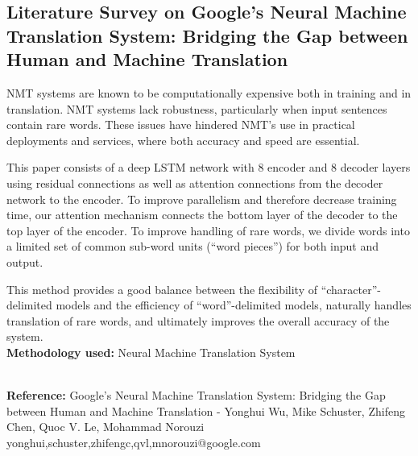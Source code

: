 \subsection{Literature Survey on Google’s Neural Machine Translation System: Bridging the Gap between Human and Machine Translation}
{\normalsize {\par NMT systems are known to be computationally expensive both in training and in translation. NMT systems lack robustness, particularly when input sentences contain rare words. These issues have hindered NMT’s use in practical deployments and services, where both accuracy and speed are essential.
\par This paper consists of a deep LSTM network with 8 encoder and 8 decoder layers using residual connections as well as attention connections from the decoder network to the encoder. To improve parallelism and therefore decrease training time, our attention mechanism connects the bottom layer of the decoder to the top layer of the encoder. To improve handling of rare words, we divide words into a limited set of common sub-word units (“word pieces”) for both input and output.
\par This method provides a good balance between the flexibility of “character”-delimited models and the efficiency of “word”-delimited models, naturally handles translation of rare words, and ultimately improves the overall accuracy of the system. 
\\
\newline
{\textbf{Methodology used:}} Neural Machine Translation System}}
\newline
\\
{\textbf{Reference:} Google’s Neural Machine Translation System: Bridging the Gap between Human and Machine Translation - Yonghui Wu, Mike Schuster, Zhifeng Chen, Quoc V. Le, Mohammad Norouzi yonghui,schuster,zhifengc,qvl,mnorouzi@google.com}
